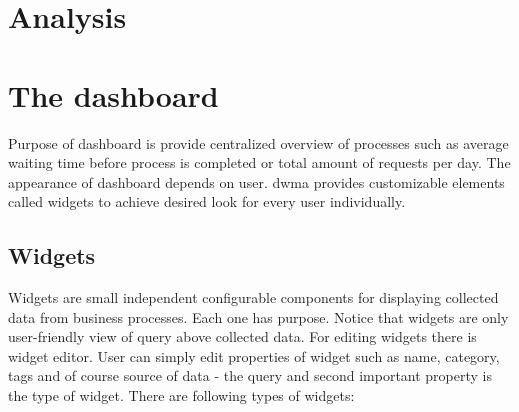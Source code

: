     
    
   
   
    
    
    \section{Analysis}    

   

	\section{The dashboard}
    Purpose of dashboard is provide centralized overview of processes such as average waiting time before process is completed or total amount of requests per day. The appearance of dashboard depends on user. \gls{dwma} provides customizable elements called widgets to achieve desired look for every user individually.

    \subsection{Widgets}  
     Widgets are small independent configurable components for displaying collected data from business processes. Each one has purpose. Notice that widgets are only user-friendly view of query above collected data. For editing widgets there is widget editor. User can simply edit properties of widget such as name, category, tags and of course source of data - the query and second important property is the type of widget. There are following types of widgets:
     
